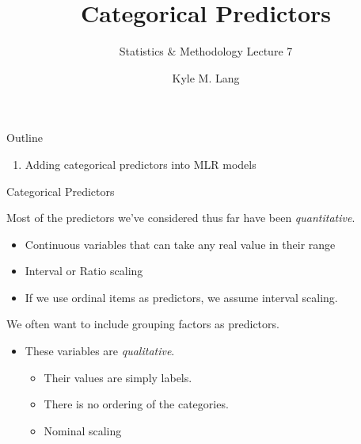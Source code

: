 \documentclass{beamer}\usepackage[]{graphicx}\usepackage[]{color}
\title{Categorical Predictors}
\subtitle{Statistics \& Methodology Lecture 7}
\author{Kyle M. Lang}
\institute{Department of Methodology \& Statistics\\Tilburg University}
\date{}
\begin{document}

\begin{frame}[t,plain]
\titlepage
\end{frame}


\begin{frame}{Outline}

  \begin{enumerate}
  \item Adding categorical predictors into MLR models
  \end{enumerate}
  
\end{frame}


\begin{frame}{Categorical Predictors}
  
  Most of the predictors we've considered thus far have been \emph{quantitative}.
  \vc
  \begin{itemize}
  \item Continuous variables that can take any real value in their range
    \vc
  \item Interval or Ratio scaling
    \vc
  \item If we use ordinal items as predictors, we assume interval scaling.
  \end{itemize}
  \vb
  We often want to include grouping factors as predictors.
  \vc
  \begin{itemize}
  \item These variables are \emph{qualitative}.
    \begin{itemize}
    \item Their values are simply labels.
    \item There is no ordering of the categories.
    \item Nominal scaling
    \end{itemize}
  \end{itemize}
  
\end{frame}

\end{document}
